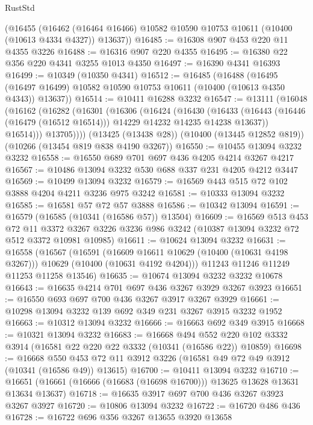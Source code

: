 \begin{lexlean}{RustStd}
\begin{coremodule}
{\begin{coremodule}
{{{{{{{{{{{{{{{{{{{{{{{{{    (@16455
      (@16462 (@16464 @16466) @10582 @10590 @10753 @10611 (@10400 (@10613 @4334 @4327)) @13637))
@16485 := @16308 @907 @453 @220 @11 @4355 @3226
@16488 := @16316 @907 @220 @4355
@16495 := @16380 @22 @356 @220 @4341 @3255 @1013 @4350
@16497 := @16390 @4341 @16393
@16499 := @10349 (@10350 @4341)
@16512 := @16485
    (@16488
      (@16495 (@16497 @16499) @10582 @10590 @10753 @10611 (@10400 (@10613 @4350 @4343)) @13637))
@16514 := @10411 @16288 @3232
@16547 := @13111
    (@16048
      (@16162
        (@16282
          (@16301
            (@16306
              (@16424
                (@16430
                  (@16433
                    (@16443 (@16446 (@16479 (@16512 @16514))) @14229 @14232 @14235 @14238 @13637))
                  @16514)))
            @13705))))
    (@13425 (@13438 @28))
    (@10400 (@13445 @12852 @819))
    (@10266 (@13454 @819 @838 @4190 @3267))
@16550 := @10455 @13094 @3232 @3232
@16558 := @16550 @689 @701 @697 @436 @4205 @4214 @3267 @4217
@16567 := @10486 @13094 @3232 @530 @688 @337 @231 @4205 @4212 @3447
@16569 := @10499 @13094 @3232
@16579 := @16569 @443 @515 @72 @102 @3888 @4204 @4211 @3236 @975 @3242
@16581 := @10333 @13094 @3232
@16585 := @16581 @57 @72 @57 @3888
@16586 := @10342 @13094
@16591 := @16579 (@16585 (@10341 (@16586 @57)) @13504)
@16609 := @16569
    @513
    @453
    @72
    @11
    @3372
    @3267
    @3226
    @3236
    @986
    @3242
    (@10387 @13094 @3232 @72 @512 @3372 @10981 @10985)
@16611 := @10624 @13094 @3232
@16631 := @16558
    (@16567
      (@16591
        (@16609 @16611 @10629 (@10400 (@10631 @4198 @3267)))
        @10629
        (@10400 (@10631 @4192 @4204)))
      @11243
      @11246
      @11249
      @11253
      @11258
      @13546)
@16635 := @10674 @13094 @3232 @3232 @10678
@16643 := @16635 @4214 @701 @697 @436 @3267 @3929 @3267 @3923
@16651 := @16550 @693 @697 @700 @436 @3267 @3917 @3267 @3929
@16661 := @10298 @13094 @3232 @139 @692 @349 @231 @3267 @3915 @3232 @1952
@16663 := @10312 @13094 @3232
@16666 := @16663 @692 @349 @3915
@16668 := @10321 @13094 @3232
@16683 := @16668
    @494
    @552
    @220
    @102
    @3332
    @3914
    (@16581 @22 @220 @22 @3332 (@10341 (@16586 @22)) @10859)
@16698 := @16668
    @550
    @453
    @72
    @11
    @3912
    @3226
    (@16581 @49 @72 @49 @3912 (@10341 (@16586 @49)) @13615)
@16700 := @10411 @13094 @3232
@16710 := @16651 (@16661 (@16666 (@16683 (@16698 @16700))) @13625 @13628 @13631 @13634 @13637)
@16718 := @16635 @3917 @697 @700 @436 @3267 @3923 @3267 @3927
@16720 := @10806 @13094 @3232
@16722 := @16720 @486 @436
@16728 := @16722 @696 @356 @3267 @13655 @3920 @13658
}}}}}}}}}}}}}}}}}}}}}}}}}
\end{coremodule}}
\end{coremodule}
\end{lexlean}
